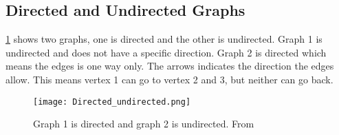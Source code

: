 \subsection{Directed and Undirected Graphs}

\cref{fig:labeled_Directed_undirected} shows two graphs, one is directed and the other is undirected. Graph 1 is undirected and does not have a specific direction. Graph 2 is directed which means the edges is one way only. The arrows indicates the direction the edges allow. This means vertex 1 can go to vertex 2 and 3, but neither can go back. 


\begin{figure}[ht!]
    \centering
    \texttt{[image: Directed\_undirected.png]}
    
    \caption{Graph 1 is directed and graph 2 is undirected. From \cite{dir_pic}}\label{fig:labeled_Directed_undirected}


  \end{figure}